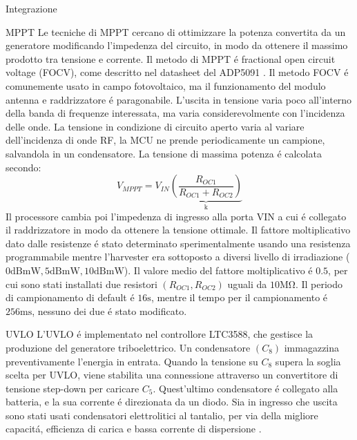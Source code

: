 \begin{section}{Integrazione}
    \begin{subsection}{MPPT}
        Le tecniche di MPPT cercano di ottimizzare la potenza convertita da un generatore modificando l'impedenza del circuito, in modo da ottenere il massimo prodotto tra tensione e corrente. Il metodo di MPPT \'e fractional open circuit voltage (FOCV), come descritto nel datasheet del ADP5091 \cite{ADP5091DatasheetProduct}. Il metodo FOCV \'e comunemente usato in campo fotovoltaico, ma il funzionamento del modulo antenna e raddrizzatore \'e paragonabile. L'uscita in tensione varia poco all'interno della banda di frequenze interessata, ma varia considerevolmente con l'incidenza delle onde. La tensione in condizione di circuito aperto varia al variare dell'incidenza di onde RF, la MCU ne prende periodicamente un campione, salvandola in un condensatore. La tensione di massima potenza \'e calcolata secondo:
        \begin{equation*}
            V_{MPPT} = V_{IN}\underbrace{\left(\frac{R_{OC1}}{R_{OC1}+R_{OC2}}\right)}_\mathrm{k}
         \end{equation*}
        Il processore cambia poi l'impedenza di ingresso alla porta VIN a cui \'e collegato il raddrizzatore in modo da ottenere la tensione ottimale. Il fattore moltiplicativo dato dalle resistenze \'e stato determinato sperimentalmente usando una resistenza programmabile mentre l'harvester era sottoposto a diversi livello di irradiazione (\(0\mathrm{dBmW},5\mathrm{dBmW},10\mathrm{dBmW}\)). Il valore medio del fattore moltiplicativo \'e \(0.5\), per cui sono stati installati due resistori \((R_{OC1},R_{OC2})\) uguali da \(10\mathrm{M\Omega}\). Il periodo di campionamento di default \'e \(16\mathrm{s}\), mentre il tempo per il campionamento \'e \(256\mathrm{ms}\), nessuno dei due \'e stato modificato.
    \end{subsection}

    \begin{subsection}{UVLO}
        L'UVLO \'e implementato nel controllore LTC3588, che gestisce la produzione del generatore triboelettrico. Un condensatore \((C_8)\) immagazzina preventivamente l'energia in entrata. Quando la tensione su  \(C_8\) supera la soglia scelta per UVLO, viene stabilita una connessione attraverso un convertitore di tensione step-down per caricare \(C_5\). Quest'ultimo condensatore \'e collegato alla batteria, e la sua corrente \'e direzionata da un diodo. Sia in ingresso che uscita sono stati usati condensatori elettrolitici al tantalio, per via della migliore capacit\'a, efficienza di carica e bassa corrente di dispersione \cite{torkiElectrolyticCapacitorProperties2023}.
    \end{subsection}


\end{section}
